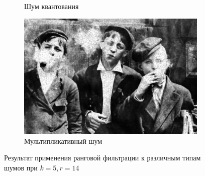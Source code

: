 \begin{figure}[ht!]
\begin{subfigure}[b]{0.5\linewidth}
      \caption{Шум квантования} 
      \label{rang_5_14:e}
    \end{subfigure}%
    \begin{subfigure}[b]{0.5\linewidth}
        \centering
        \includegraphics[width=0.95\linewidth]{../Rang_Filter/Rang_Speckle_noise_(k=5,r=14).jpg} 
        \caption{Мультипликативный шум} 
        \label{rang_5_14:f} 
    \end{subfigure} 
    \caption{Результат применения ранговой фильтрации к различным типам шумов при $k = 5, r = 14$}
    \label{img:rang_5_14} 
\end{figure}

